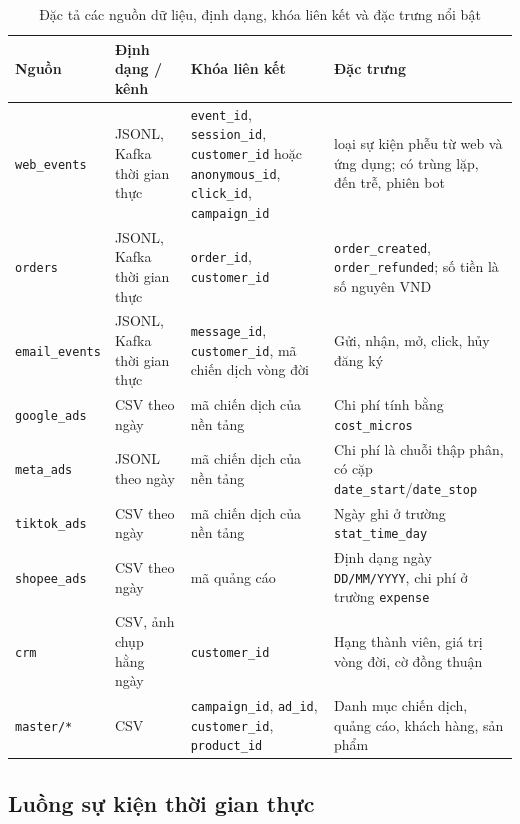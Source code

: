 \begin{table}[H]
\centering
\caption{Đặc tả các nguồn dữ liệu, định dạng, khóa liên kết và đặc trưng nổi bật}
\label{tab:sources}
\small
\renewcommand{\arraystretch}{1.2}
\begin{tabularx}{\textwidth}{>{\raggedright\arraybackslash}p{2.5cm} >{\raggedright\arraybackslash}p{2.2cm} >{\raggedright\arraybackslash}p{4.8cm} >{\raggedright\arraybackslash}X}
\toprule
\textbf{Nguồn} & \textbf{Định dạng / kênh} & \textbf{Khóa liên kết} & \textbf{Đặc trưng} \\
\midrule
\texttt{web\_events} & JSONL, Kafka thời gian thực & \texttt{event\_id}, \texttt{session\_id}, \texttt{customer\_id} hoặc \texttt{anonymous\_id}, \texttt{click\_id}, \texttt{campaign\_id} & 5 loại sự kiện phễu từ web và ứng dụng; có trùng lặp, đến trễ, phiên bot \\
\texttt{orders} & JSONL, Kafka thời gian thực & \texttt{order\_id}, \texttt{customer\_id} & \texttt{order\_created}, \texttt{order\_refunded}; số tiền là số nguyên VND \\
\texttt{email\_events} & JSONL, Kafka thời gian thực & \texttt{message\_id}, \texttt{customer\_id}, mã chiến dịch vòng đời & Gửi, nhận, mở, click, hủy đăng ký \\
\texttt{google\_ads} & CSV theo ngày & mã chiến dịch của nền tảng & Chi phí tính bằng \texttt{cost\_micros} \\
\texttt{meta\_ads} & JSONL theo ngày & mã chiến dịch của nền tảng & Chi phí là chuỗi thập phân, có cặp \texttt{date\_start}/\texttt{date\_stop} \\
\texttt{tiktok\_ads} & CSV theo ngày & mã chiến dịch của nền tảng & Ngày ghi ở trường \texttt{stat\_time\_day} \\
\texttt{shopee\_ads} & CSV theo ngày & mã quảng cáo & Định dạng ngày \texttt{DD/MM/YYYY}, chi phí ở trường \texttt{expense} \\
\texttt{crm} & CSV, ảnh chụp hằng ngày & \texttt{customer\_id} & Hạng thành viên, giá trị vòng đời, cờ đồng thuận \\
\texttt{master/*} & CSV & \texttt{campaign\_id}, \texttt{ad\_id}, \texttt{customer\_id}, \texttt{product\_id} & Danh mục chiến dịch, quảng cáo, khách hàng, sản phẩm \\
\bottomrule
\end{tabularx}
\end{table}

\subsection{Luồng sự kiện thời gian thực}
\label{sec:c2-luong-su-kien}

